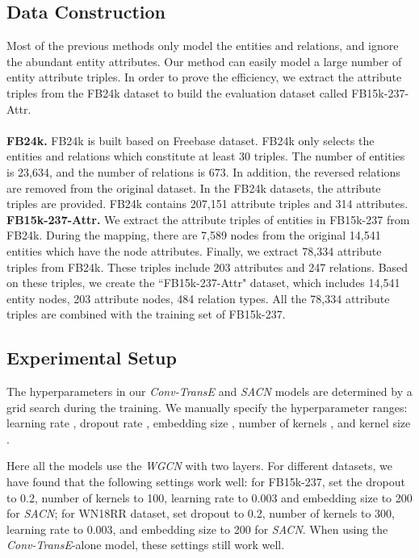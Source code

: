 \documentclass[letterpaper]{article} \usepackage{aaai19}  \usepackage{times}  \usepackage{helvet}  \usepackage{courier}  \usepackage{url}  \usepackage{graphicx}  \usepackage{amsmath}
\begin{document}
\subsection{Data Construction}
Most of the previous methods only model the entities and relations, and ignore the abundant entity attributes. Our method can easily model a large number of entity attribute triples. In order to prove the efficiency, we extract the attribute triples from the FB24k \cite{lin2016knowledge} dataset to build the evaluation dataset called FB15k-237-Attr.\\
\\
\textbf{FB24k.} 
FB24k \cite{lin2016knowledge} is built based on Freebase dataset. FB24k only selects the entities and relations which constitute at least 30 triples. The number of entities is 23,634, and the number of relations is 673. In addition, the reversed relations are removed from the original dataset. In the FB24k datasets, the attribute triples are provided. FB24k contains 207,151 attribute triples and 314 attributes. \\
\textbf{FB15k-237-Attr.} 
We extract the attribute triples of entities in FB15k-237 from FB24k. During the mapping, there are 7,589 nodes from the original 14,541 entities which have the node attributes. Finally, we extract 78,334 attribute triples from FB24k. These triples include 203 attributes and 247 relations. 
Based on these triples, we create the ``FB15k-237-Attr" dataset, which includes 14,541 entity nodes, 203 attribute nodes, 484 relation types. All the 78,334 attribute triples are combined with the training set of FB15k-237.

\subsection{Experimental Setup}

The hyperparameters in our {\it Conv-TransE} and {\it SACN} models are determined by a grid search during the training. We manually specify the hyperparameter ranges: learning rate , dropout rate , embedding size , number of kernels , and kernel size .

Here all the models use the {\it WGCN} with two layers.
For different datasets, we have found that the following  settings work well: for FB15k-237, set the dropout to 0.2, number of kernels to 100, learning rate to 0.003 and embedding size to 200 for {\it SACN};
for WN18RR dataset, set dropout to 0.2, number of kernels to 300, learning rate to 0.003, and embedding size to 200 for {\it SACN}. 
When using the {\it Conv-TransE}-alone model, these settings still work well.
\end{document}
